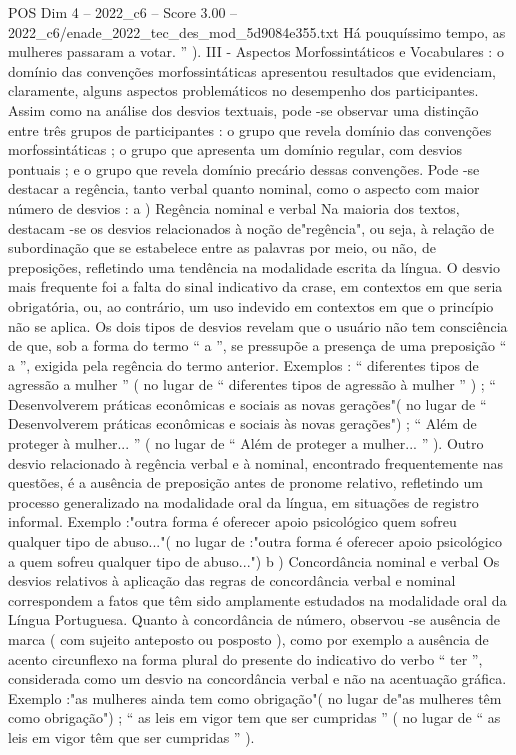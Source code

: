 \begin{textsample}{POS Dim 4 – 2022\_c6 – Score 3.00 – 2022\_c6/enade\_2022\_tec\_des\_mod\_5d9084e355.txt}
Há pouquíssimo tempo, as mulheres passaram a votar. ” ).
III - Aspectos Morfossintáticos e Vocabulares : o domínio das convenções morfossintáticas apresentou resultados que evidenciam, claramente, alguns aspectos problemáticos no desempenho dos participantes.
Assim como na análise dos desvios textuais, pode -se observar uma distinção entre três grupos de participantes : o grupo que revela domínio das convenções morfossintáticas ; o grupo que apresenta um domínio regular, com desvios pontuais ; e o grupo que revela domínio precário dessas convenções.
Pode -se destacar a regência, tanto verbal quanto nominal, como o aspecto com maior número de desvios : a ) Regência nominal e verbal Na maioria dos textos, destacam -se os desvios relacionados à noção de"regência", ou seja, à relação de subordinação que se estabelece entre as palavras por meio, ou não, de preposições, refletindo uma tendência na modalidade escrita da língua.
O desvio mais frequente foi a falta do sinal indicativo da crase, em contextos em que seria obrigatória, ou, ao contrário, um uso indevido em contextos em que o princípio não se aplica.
Os dois tipos de desvios revelam que o usuário não tem consciência de que, sob a forma do termo “ a ”, se pressupõe a presença de uma preposição “ a ”, exigida pela regência do termo anterior.
Exemplos : “ diferentes tipos de agressão a mulher ” ( no lugar de “ diferentes tipos de agressão à mulher ” ) ; “ Desenvolverem práticas econômicas e sociais as novas gerações"( no lugar de “ Desenvolverem práticas econômicas e sociais às novas gerações") ; “ Além de proteger à mulher... ” ( no lugar de “ Além de proteger a mulher... ” ).
Outro desvio relacionado à regência verbal e à nominal, encontrado frequentemente nas questões, é a ausência de preposição antes de pronome relativo, refletindo um processo generalizado na modalidade oral da língua, em situações de registro informal.
Exemplo :"outra forma é oferecer apoio psicológico quem sofreu qualquer tipo de abuso..."( no lugar de :"outra forma é oferecer apoio psicológico a quem sofreu qualquer tipo de abuso...") b ) Concordância nominal e verbal Os desvios relativos à aplicação das regras de concordância verbal e nominal correspondem a fatos que têm sido amplamente estudados na modalidade oral da Língua Portuguesa.
Quanto à concordância de número, observou -se ausência de marca ( com sujeito anteposto ou posposto ), como por exemplo a ausência de acento circunflexo na forma plural do presente do indicativo do verbo “ ter ”, considerada como um desvio na concordância verbal e não na acentuação gráfica.
Exemplo :"as mulheres ainda tem como obrigação"( no lugar de"as mulheres têm como obrigação") ; “ as leis em vigor tem que ser cumpridas ” ( no lugar de “ as leis em vigor têm que ser cumpridas ” ).

\end{textsample}
